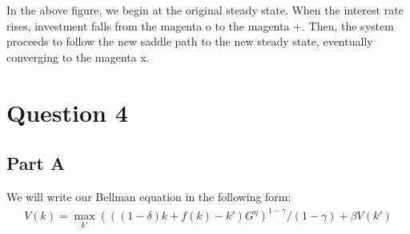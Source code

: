 \documentclass[11pt]{article} %
\begin{document}
In the above figure, we begin at the original steady state. When the  interest rate rises, investment falls from the magenta o to the magenta $+$. Then, the system proceeds to follow the new saddle path to the new steady state, eventually converging to the magenta x.

\section{Question 4}
\subsection{Part A}
%
%
%
We will write our Bellman equation in the following form:
\begin{align}
V(k) = \max_{k'} (((1-\delta) k + f(k) - k')G^{\eta})^{1-\gamma}/(1-\gamma) + \beta V(k') \label{eqn:bellk}
\end{align}
\end{document}
